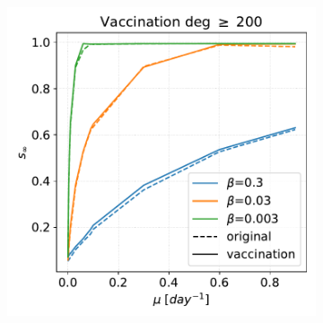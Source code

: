 \documentclass[a4paper,11pt, twocolumn]{article}
\begin{document}
\begin{figure}[t!]
\begin{subfigure}[t]{0.32\textwidth}
\caption{}
\end{subfigure}
\begin{subfigure}[t]{0.32\textwidth}
 \centering
\includegraphics[scale=0.30]{./Figure/SIR/vax_deg_200.pdf}
\caption{}
\end{subfigure}


\end{figure}
\end{document}
